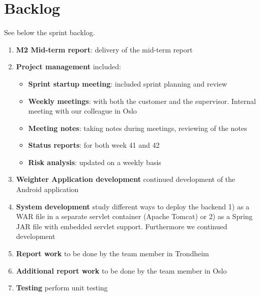 \clearpage
\section{Backlog}
See below the sprint backlog.

\begin{enumerate}[1.]
\item \textbf{M2 Mid-term report}:
	delivery of the mid-term report
\item \textbf{Project management} included:
	\begin{itemize}
		\item \textbf{Sprint startup meeting}:
			included sprint planning and review
		\item \textbf{Weekly meetings}: 
			with both the customer and the supervisor. Internal meeting with our colleague in Oslo
		\item \textbf{Meeting notes}:
			taking notes during meetings, reviewing of the notes
		\item \textbf{Status reports}:
			for both week 41 and 42
		\item \textbf{Risk analysis}:
			updated on a weekly basis
	\end{itemize}
	\item \textbf{Weighter Application development}\newline
		continued development of the Android application
	\item \textbf{System development}\newline
		study different ways to deploy the backend
		1) as a WAR file in a separate servlet container (Apache Tomcat) or 2) as a Spring JAR file
		with embedded servlet support. Furthermore we continued development
	\item \textbf{Report work}\newline
		to be done by the team member in Trondheim
	\item \textbf{Additional report work}\newline
		to be done by the team member in Oslo
	\item \textbf{Testing}\newline
		perform unit testing
\end{enumerate}
